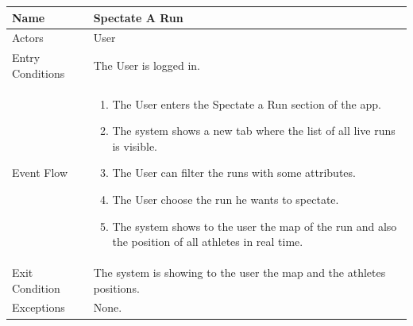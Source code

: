 \begin{enumerate}
\FloatBarrier
\begin{table}[h]
\begin{tabular}{|l|p{}|}
\hline
Name             & Spectate A Run \\ \hline
Actors           & User  \\ \hline
Entry Conditions & The User is logged in.    \\ \hline
Event Flow       & \begin{enumerate}
            \item The User enters the Spectate a Run section of the app.
            \item The system shows a new tab where the list of all live runs is visible.
            \item The User can filter the runs with some attributes.
            \item The User choose the run he wants to spectate.
            \item The system shows to the user the map of the run and also the position of all athletes in real time.
        \end{enumerate}\\ \hline
Exit Condition   & The system is showing to the user the map and the athletes positions.\\ \hline
Exceptions       & None.\\ \hline
\end{tabular}
\end{table}
\FloatBarrier

\end{enumerate}



